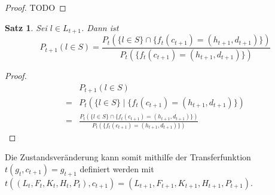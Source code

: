 \documentclass[a4paper,12pt]{llncs}
\numberwithin{equation}{section}
\newtheorem{satz}{Satz}
\begin{document}
\begin{proof}
TODO
\end{proof}


\begin{satz}
Sei $l \in L_{t+1}$.
Dann ist
\[
P_{t+1}(l \in S) = \frac{P_t(\{l \in S\} \cap \{f_t(c_{t+1})=(h_{t+1}, d_{t+1})\})}{P_t(\{f_t(c_{t+1})=(h_{t+1}, d_{t+1})\})}
\]
\end{satz}

\begin{proof}
\begin{align}
&P_{t+1}(l \in S) \\
=&P_t(\{l \in S\} \mid \{f_t(c_{t+1})=(h_{t+1}, d_{t+1})\}) \\
=&\frac{P_t(\{l \in S\} \cap \{f_t(c_{t+1})=(h_{t+1}, d_{t+1})\})}{P_t(\{f_t(c_{t+1})=(h_{t+1}, d_{t+1})\})}
\end{align}
\end{proof}


\begin{theorem}
Die Zustandsveränderung kann somit mithilfe der Transferfunktion $t(g_t, c_{t+1})=g_{t+1}$ definiert werden mit $t((L_t, F_t, K_t, H_t, P_t), c_{t+1})=(L_{t+1}, F_{t+1}, K_{t+1}, H_{t+1}, P_{t+1})$.
\end{theorem}

\newpage

 

\end{document}
